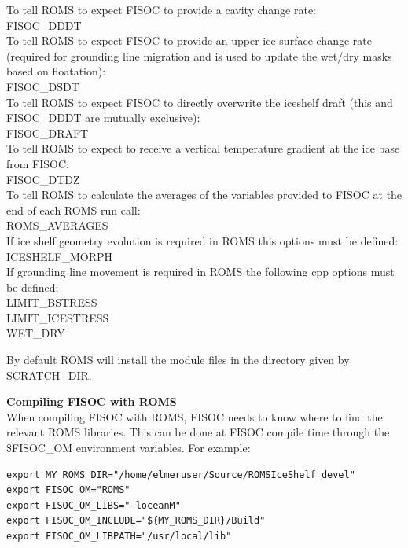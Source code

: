 \documentclass[11pt]{article}
\begin{document}
\begin{flushleft}
To tell ROMS to expect FISOC to provide a cavity change rate:\\
FISOC\_DDDT\\
To tell ROMS to expect FISOC to provide an upper ice surface change rate
(required for grounding line migration 
and is used to update the wet/dry masks based on floatation):\\
FISOC\_DSDT\\
To tell ROMS to expect FISOC to directly overwrite the iceshelf draft 
(this and FISOC\_DDDT are mutually exclusive):\\
FISOC\_DRAFT\\
To tell ROMS to expect to receive a vertical temperature gradient 
at the ice base from FISOC: \\
FISOC\_DTDZ\\
To tell ROMS to calculate the averages of the variables provided to FISOC at 
the end of each ROMS run call:\\
ROMS\_AVERAGES\\
If ice shelf geometry evolution is required in ROMS this options must be 
defined:\\
ICESHELF\_MORPH\\
If grounding line movement is required in ROMS the following cpp options 
must be defined:\\
LIMIT\_BSTRESS\\
LIMIT\_ICESTRESS\\
WET\_DRY
\end{flushleft}


By default ROMS will install the module files in the directory given by 
 SCRATCH\_DIR.  

\vspace{10pt}
\textbf{Compiling FISOC with ROMS}\\
When compiling FISOC with ROMS, FISOC needs to know where to 
find the relevant ROMS libraries.  
This can be done at FISOC compile time through the 
\$FISOC\_OM
environment variables.  For example:

\begin{lstlisting}
export MY_ROMS_DIR="/home/elmeruser/Source/ROMSIceShelf_devel"
export FISOC_OM="ROMS"
export FISOC_OM_LIBS="-loceanM"
export FISOC_OM_INCLUDE="${MY_ROMS_DIR}/Build"
export FISOC_OM_LIBPATH="/usr/local/lib"
\end{lstlisting}
\end{document}
